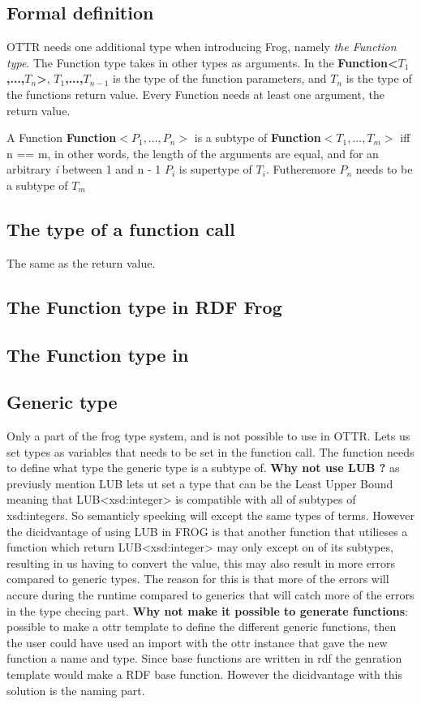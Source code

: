 \subsection{Formal definition}
OTTR needs one additional type when introducing Frog, namely \emph{the Function type}. The Function type takes in other types as arguments. In the \textbf{Function<$T_1$,...,$T_n$>},\textbf{ $T_1$,...,$T_{n - 1}$} is the type of the function parameters, and \textbf{$T_n$} is the type of the functions return value. Every Function needs at least one argument, the return value. 

\para
A Function \textbf{Function$<P_1,...,P_n>$} is a subtype of \textbf{Function$<T_1,...,T_m>$} iff n == m, in other words, the length of the arguments are equal, and for an arbitrary \textit{i} between 1 and n - 1  \textbf{$P_i$} is supertype of \textbf{$T_i$}. Futheremore \textbf{$P_n$} needs to be a subtype of \textbf{$T_m$}

\subsection{The type of a function call}
The same as the return value.

\subsection{The Function type in RDF Frog}

\subsection{The Function type in }

\subsection{Generic type}
Only a part of the frog type system, and is not possible to use in OTTR. Lets us set types as variables that needs to be set in the function call. The function needs to define what type the generic type is a subtype of. \textbf{Why not use LUB ?} as previusly mention LUB lets ut set a type that can be the Least Upper Bound meaning that LUB<xsd:integer> is compatible with all of subtypes of xsd:integers. So semanticly speeking will except the same types of terms. However the dicidvantage of using LUB in FROG is that another function that utilieses a function which return LUB<xsd:integer> may only except on of its subtypes, resulting in us having to convert the value, this may also result in more errors compared to generic types. The reason for this is that more of the errors will accure during the runtime compared to generics that will catch more of the errors in the type checing part. \textbf{Why not make it possible to generate functions}: possible to make a ottr template to define the different generic functions, then the user could have used an import with the ottr instance that gave the new function a name and type. Since base functions are written in rdf the genration template would make a RDF base function. However the dicidvantage with this solution is the naming part. 

